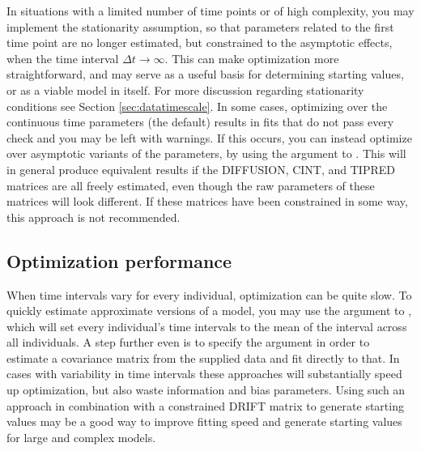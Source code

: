 \documentclass[nojss]{jss}\usepackage[]{graphicx}\usepackage[]{color}
\begin{document}
In situations with a limited number of time points or of high complexity, you may implement the stationarity assumption, so that parameters related to the first time point are no longer estimated, but constrained to the asymptotic effects, when the time interval $\Delta t\to\infty$. This can make optimization more straightforward, and may serve as a useful basis for determining starting values, or as a viable model in itself.  For more discussion regarding stationarity conditions see Section \ref{sec:datatimescale}. 
In some cases, optimizing over the continuous time parameters (the default) results in fits that do not pass every check and you may be left with warnings. If this occurs, you can instead optimize over asymptotic variants of the parameters, by using the argument  to . This will in general produce equivalent results if the DIFFUSION, CINT, and TIPRED matrices are all freely estimated, even though the raw parameters of these matrices will look different. If these matrices have been constrained in some way, this approach is not recommended.

\subsection{Optimization performance}\nopagebreak
When time intervals vary for every individual, optimization can be quite slow.  To quickly estimate approximate versions of a model, you may use the  argument to , which will set every individual's time intervals to the mean of the interval across all individuals. A step further even is to specify the argument  in order to estimate a covariance matrix from the supplied data and fit directly to that. In cases with variability in time intervals these approaches will substantially speed up optimization, but also waste information and bias parameters. Using such an approach in combination with a constrained DRIFT matrix to generate starting values may be a good way to improve fitting speed and generate starting values for large and complex models.
\end{document}
